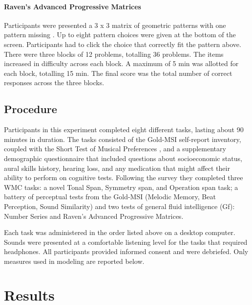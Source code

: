 \documentclass[12pt,]{book}
\let\oldparagraph\paragraph
\renewcommand{\paragraph}[1]{\oldparagraph{#1}\mbox{}}
\begin{document}
\hypertarget{ravens-advanced-progressive-matrices}{%
\paragraph{Raven's Advanced Progressive Matrices}\label{ravens-advanced-progressive-matrices}}

Participants were presented a 3 x 3 matrix of geometric patterns with one pattern missing \citep{ravenManualRavenProgressive1994}. Up to eight pattern choices were given at the bottom of the screen.
Participants had to click the choice that correctly fit the pattern above.
There were three blocks of 12 problems, totalling 36 problems.
The items increased in difficulty across each block.
A maximum of 5 min was allotted for each block, totalling 15 min.
The final score was the total number of correct responses across the three blocks.

\hypertarget{procedure}{%
\subsection{Procedure}\label{procedure}}

Participants in this experiment completed eight different tasks, lasting about 90 minutes in duration.
The tasks consisted of the Gold-MSI self-report inventory, coupled with the Short Test of Musical Preferences \citep{rentfrowReMiEveryday2003}, and a supplementary demographic questionnaire that included questions about socioeconomic status, aural skills history, hearing loss, and any medication that might affect their ability to perform on cognitive tests.
Following the survey they completed three WMC tasks: a novel Tonal Span, Symmetry span, and Operation span task; a battery of perceptual tests from the Gold-MSI (Melodic Memory, Beat Perception, Sound Similarity) and two tests of general fluid intelligence (Gf): Number Series and Raven's Advanced Progressive Matrices.

Each task was administered in the order listed above on a desktop computer.
Sounds were presented at a comfortable listening level for the tasks that required headphones.
All participants provided informed consent and were debriefed.
Only measures used in modeling are reported below.

\hypertarget{results}{%
\section{Results}\label{results}}
\end{document}
